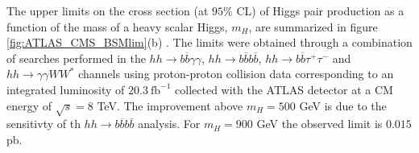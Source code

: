 The upper limits on the cross section (at $95\%$ CL) of Higgs pair production as a function of the mass of a heavy scalar Higgs, $m_H$, are summarized in figure \ref{fig:ATLAS_CMS_BSMlim}(b) \cite{ATLAShhBSMcomb}. The limits were obtained through a combination of searches performed in the $hh\rightarrow b\overline{b}\gamma\gamma$, $hh\rightarrow b\overline{b}b\overline{b}$, $hh\rightarrow b\overline{b}\tau^+\tau^-$ and $hh\rightarrow \gamma\gamma WW^*$ channels using proton-proton collision data corresponding to an integrated luminosity of $20.3~\text{fb}^{-1}$ collected with the ATLAS detector at a CM energy of $\sqrt{s}=8$ TeV. The improvement above $m_H=500$ GeV is due to the sensitivty of th $hh\rightarrow b\overline{b}b\overline{b}$ analysis. For $m_H=900$ GeV the observed limit is $0.015$ pb.


